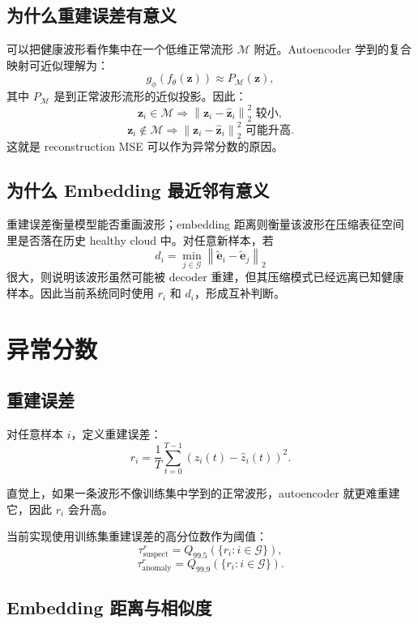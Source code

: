\documentclass[UTF8,fontset=fandol]{ctexart}
\begin{document}
\subsection{为什么重建误差有意义}

可以把健康波形看作集中在一个低维正常流形 $\mathcal{M}$ 附近。Autoencoder 学到的复合映射可近似理解为：
\[
  g_\phi(f_\theta(\bm{z}))
  \approx
  P_{\mathcal{M}}(\bm{z}),
\]
其中 $P_{\mathcal{M}}$ 是到正常波形流形的近似投影。因此：
\[
  \bm{z}_i \in \mathcal{M}
  \Rightarrow
  \left\|\bm{z}_i-\hat{\bm{z}}_i\right\|_2^2
  \text{ 较小},
\]
\[
  \bm{z}_i \notin \mathcal{M}
  \Rightarrow
  \left\|\bm{z}_i-\hat{\bm{z}}_i\right\|_2^2
  \text{ 可能升高}.
\]
这就是 reconstruction MSE 可以作为异常分数的原因。

\subsection{为什么 Embedding 最近邻有意义}

重建误差衡量模型能否重画波形；embedding 距离则衡量该波形在压缩表征空间里是否落在历史 healthy cloud 中。对任意新样本，若
\[
  d_i =
  \min_{j \in \mathcal{G}}
  \left\|
    \tilde{\bm{e}}_i-\tilde{\bm{e}}_j
  \right\|_2
\]
很大，则说明该波形虽然可能被 decoder 重建，但其压缩模式已经远离已知健康样本。因此当前系统同时使用 $r_i$ 和 $d_i$，形成互补判断。

\section{异常分数}

\subsection{重建误差}

对任意样本 $i$，定义重建误差：
\[
  r_i
  =
  \frac{1}{T}
  \sum_{t=0}^{T-1}
  \left(z_i(t)-\hat{z}_i(t)\right)^2.
\]

直觉上，如果一条波形不像训练集中学到的正常波形，autoencoder 就更难重建它，因此 $r_i$ 会升高。

当前实现使用训练集重建误差的高分位数作为阈值：
\[
  \tau^{r}_{\text{suspect}} = Q_{99.5}\left(\{r_i:i\in\mathcal{G}\}\right),
\]
\[
  \tau^{r}_{\text{anomaly}} = Q_{99.9}\left(\{r_i:i\in\mathcal{G}\}\right).
\]

\subsection{Embedding 距离与相似度}
\end{document}
